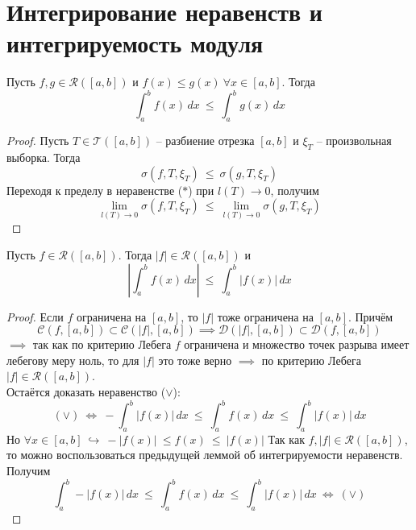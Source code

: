 \documentclass[11pt]{article}
\begin{document}
\section{Интегрирование неравенств и интегрируемость модуля}

\begin{lemma}
  Пусть $f, g \in \mathcal{R}([a, b])$ и $f(x) \leq g(x) \ \forall x \in [a, b]$. 
  Тогда \[\int_{a}^{b} f(x)\,dx \ \leq \ \int_{a}^{b} g(x)\,dx \]
\end{lemma}

\begin{proof}
  Пусть $T \in \mathcal{T}([a, b])$ -- разбиение отрезка $[a, b]$ и $ 
  \xi_T$ -- произвольная выборка. Тогда 
  \[\sigma (f, T, \xi_T) \ \leq \ \sigma (g, T, \xi_T) \tag{$\ast$}\]
  Переходя к пределу в неравенстве ($\ast$) при $l(T) \to 0$, получим 
  \[\lim_{l(T) \to 0} \sigma (f, T, \xi_T) \ \leq \ \lim_{l(T) \to 0} 
  \sigma (g, T, \xi_T)\]
\end{proof}

\begin{lemma}
  Пусть $f \in \mathcal{R}([a, b])$. Тогда $\left\lvert f \right\rvert \in 
  \mathcal{R}([a, b])$ и \[\left\lvert \int_{a}^{b} f(x)\,dx \right\rvert 
  \ \leq \ \int_{a}^{b} \left\lvert f(x) \right\rvert\,dx \tag{$\vee$}\]
\end{lemma}

\begin{proof}
  Если $f$ ограничена на $[a, b]$, то $\left\lvert f \right\rvert$ тоже 
  ограничена на $[a, b]$. Причём 
  \[\mathcal{C}(f, [a, b]) \subset \mathcal{C}(\left\lvert f \right\rvert, 
  [a, b]) \implies \mathcal{D}(\left\lvert f \right\rvert, [a, b]) \subset 
  \mathcal{D}(f, [a, b])\]
  $\implies$ так как по критерию Лебега $f$ ограничена и множество точек разрыва 
  имеет лебегову меру ноль, то для $\left\lvert f \right\rvert$ это тоже верно 
  $\implies$ по критерию Лебега $\left\lvert f \right\rvert \in \mathcal{R}([a, b])$. \\
  Остаётся доказать неравенство ($\vee$):
  \[(\vee) \ \Longleftrightarrow \ - \int_{a}^{b} \left\lvert f(x) 
  \right\rvert\,dx \ \leq \ \int_{a}^{b} f(x)\,dx \ \leq \ \int_{a}^{b} 
  \left\lvert f(x) \right\rvert\,dx\]
  Но $\forall x \in [a, b] \ \hookrightarrow \ - \left\lvert f(x) \right\rvert 
  \ \leq f(x) \ \leq \ \left\lvert f(x) \right\rvert$
  Так как $f, \left\lvert f \right\rvert \in \mathcal{R}([a, b])$, то можно 
  воспользоваться предыдущей леммой об интегрируемости неравенств. Получим 
  \[\int_{a}^{b} - \left\lvert f(x) \right\rvert\,dx \ \leq \ \int_{a}^{b} 
  f(x)\,dx \ \leq \ \int_{a}^{b} \left\lvert f(x) \right\rvert\,dx \ 
  \Longleftrightarrow \ (\vee)\]
\end{proof}
\end{document}
